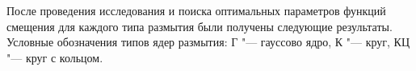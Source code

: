 После проведения исследования и поиска оптимальных параметров функций смещения для каждого типа размытия были получены следующие результаты. Условные обозначения типов ядер размытия: Г "--- гауссово ядро, К "--- круг, КЦ "--- круг с кольцом.




